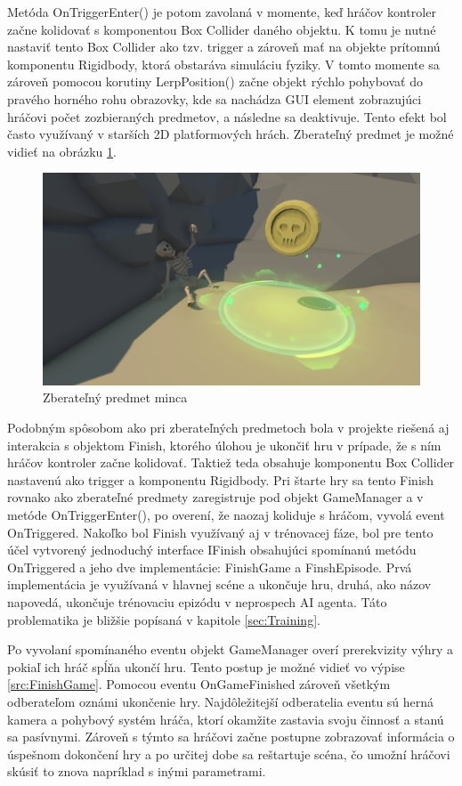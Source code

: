 \documentclass[slovak, master]{diploma}
\begin{document}
Metóda OnTriggerEnter() je potom zavolaná v momente, keď hráčov kontroler začne kolidovať s komponentou Box Collider daného objektu. K tomu je nutné nastaviť tento Box Collider ako tzv. trigger a zároveň mať na objekte prítomnú komponentu Rigidbody, ktorá obstaráva simuláciu fyziky. V tomto momente sa zároveň pomocou korutiny LerpPosition() začne objekt rýchlo pohybovať do pravého horného rohu obrazovky, kde sa nachádza GUI element zobrazujúci hráčovi počet zozbieraných predmetov, a následne sa deaktivuje. Tento efekt bol často využívaný v starších 2D platformových hrách. Zberateľný predmet je možné vidieť na obrázku \ref{pic:Pickup}.

\begin{figure}[!htbp]
    \centering
    \includegraphics[width=.9\textwidth]{Figures/pickup.png}
    \caption{Zberateľný predmet minca}
    \label{pic:Pickup}
\end{figure}

Podobným spôsobom ako pri zberateľných predmetoch bola v projekte riešená aj interakcia s objektom Finish, ktorého úlohou je ukončiť hru v prípade, že s ním hráčov kontroler začne kolidovať. Taktiež teda obsahuje komponentu Box Collider nastavenú ako trigger a komponentu Rigidbody. Pri štarte hry sa tento Finish rovnako ako zberateľné predmety zaregistruje pod objekt GameManager a v metóde \mbox{OnTriggerEnter()}, po overení, že naozaj koliduje s hráčom, vyvolá event \mbox{OnTriggered}. Nakoľko bol Finish využívaný aj v trénovacej fáze, bol pre tento účel vytvorený jednoduchý interface IFinish obsahujúci spomínanú metódu OnTriggered a jeho dve implementácie: FinishGame a FinshEpisode. Prvá implementácia je využívaná v hlavnej scéne a ukončuje hru, druhá, ako názov napovedá, ukončuje trénovaciu epizódu v neprospech AI agenta. Táto problematika je bližšie popísaná v kapitole \ref{sec:Training}.

Po vyvolaní spomínaného eventu objekt GameManager overí prerekvizity výhry a pokiaľ ich hráč spĺňa ukončí hru. Tento postup je možné vidieť vo výpise \ref{src:FinishGame}. Pomocou eventu OnGameFinished zároveň všetkým odberateľom oznámi ukončenie hry. Najdôležitejší odberatelia eventu sú herná kamera a pohybový systém hráča, ktorí okamžite zastavia svoju činnosť a stanú sa pasívnymi. Zároveň s týmto sa hráčovi začne postupne zobrazovať informácia o úspešnom dokončení hry a po určitej dobe sa reštartuje scéna, čo umožní hráčovi skúsiť to znova napríklad s inými parametrami.
\end{document}
